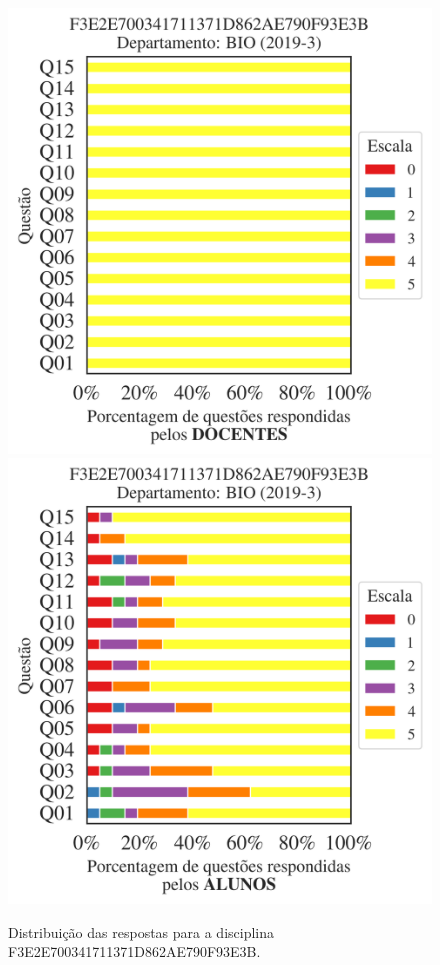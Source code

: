 \documentclass[a4paper,10pt]{article}
\begin{document}
\begin{figure}[h]
\centering
\includegraphics[width=0.485\linewidth]{analise_disciplina_departamento_BIO_F3E2E700341711371D862AE790F93E3B_docentes.png}
\includegraphics[width=0.485\linewidth]{analise_disciplina_departamento_BIO_F3E2E700341711371D862AE790F93E3B_alunos.png}
\caption{\label{fig:analise_geral_departamento}                Distribuição das respostas para a disciplina F3E2E700341711371D862AE790F93E3B. }
\end{figure}
\end{document}
